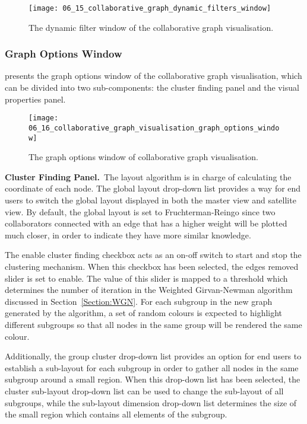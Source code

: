 \begin{figure}[!htb]
  \centering
  \texttt{[image: 06\_15\_collaborative\_graph\_dynamic\_filters\_window]}
  \caption{The dynamic filter window of the collaborative graph visualisation.}
  \label{Figure:06_15}
\end{figure}

\subsubsection{Graph Options Window} \label{sec:collaborative_graph_options_window}
 presents the graph options window of the collaborative graph visualisation, which can be divided into two sub-components: the cluster finding panel and the visual properties panel.

\begin{figure}[!htb]
  \centering
  \texttt{[image: 06\_16\_collaborative\_graph\_visualisation\_graph\_options\_window]}
  \caption{The graph options window of collaborative graph visualisation.}
  \label{Figure:06_16}
\end{figure}

\textbf{Cluster Finding Panel.}~The layout algorithm is in charge of calculating the coordinate of each node. The global layout drop-down list provides a way for end users to switch the global layout displayed in both the master view and satellite view. By default, the global layout is set to Fruchterman-Reingo \citep{Fruchterman1991} since two collaborators connected with an edge that has a higher weight will be plotted much closer, in order to indicate they have more similar knowledge.

The enable cluster finding checkbox acts as an on-off switch to start and stop the clustering mechanism. When this checkbox has been selected, the edges removed slider is set to enable. The value of this slider is mapped to a threshold which determines the number of iteration in the Weighted Girvan-Newman algorithm discussed in Section~\ref{Section:WGN}. For each subgroup in the new graph generated by the algorithm, a set of random colours is expected to highlight different subgroups so that all nodes in the same group will be rendered the same colour.

Additionally, the group cluster drop-down list provides an option for end users to establish a sub-layout for each subgroup in order to gather all nodes in the same subgroup around a small region. When this drop-down list has been selected, the cluster sub-layout drop-down list can be used to change the sub-layout of all subgroups, while the sub-layout dimension drop-down list determines the size of the small region which contains all elements of the subgroup.

